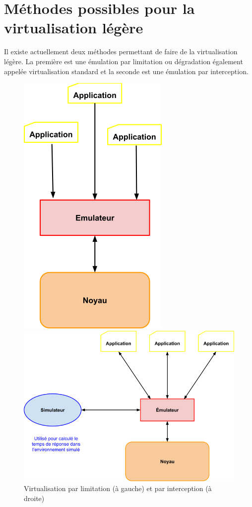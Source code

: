 \section{Méthodes possibles pour la virtualisation légère}
\label{section:emulation}

Il existe actuellement deux méthodes permettant de faire de la virtualisation
légère. La première est une émulation par limitation ou dégradation également
appelée virtualisation standard et la seconde est une émulation par
interception.

\begin{figure}[H]
  \centering
  \begin{minipage}[b]{.46\linewidth}
    \centering
    \includegraphics[scale=0.25]{Pictures/png/Virtualisation_limitation}
  \end{minipage} \hfill
  \begin{minipage}[b]{.46\linewidth}
    \centering
    \includegraphics[scale=0.25]{Pictures/png/Virtualisation_interception}
  \end{minipage} 
  \caption{Virtualisation par limitation (à gauche) et par interception (à droite)}
  \label{TYPE_VIRTUALISATION}
\end{figure}

